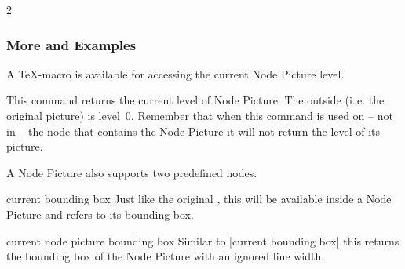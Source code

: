 \begin{multicols*}{2}
\subsubsection{More and Examples}
A \TeX-macro is available for accessing the current Node Picture level.
\begin{command}{\tikzextnodepicture}
This command returns the current level of Node Picture.
The outside (i.\,e. the original \tikzname picture) is level~0.
Remember that when this command is used on -- not in -- the node that contains
the Node Picture it will not return the level of its picture.
\end{command}
A Node Picture also supports two predefined nodes.
\begin{predefinednode}{current bounding box}
  Just like the original ,
  this will be available inside a Node Picture and refers to its bounding box.
\end{predefinednode}
\begin{ext_predefinednode}{current node picture bounding box}
  Similar to |current bounding box| this returns the bounding box of
  the Node Picture with an ignored line width.
\end{ext_predefinednode}


\end{multicols*}

